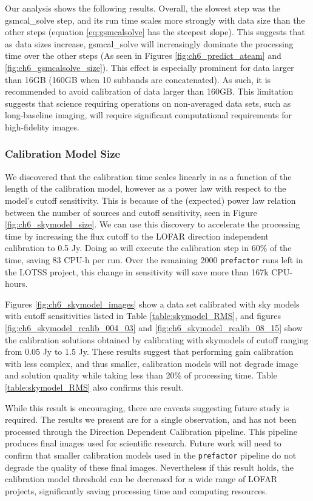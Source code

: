 Our analysis shows the following results. Overall, the slowest step was the {\selectfont gsmcal\_solve} step, and its run time scales more strongly with data size than the other steps (equation \ref{eq:gsmcalsolve} has the steepest slope). This suggests that as data sizes increase, {\selectfont gsmcal\_solve} will increasingly dominate the processing time over the other steps (As seen in Figures \ref{fig:ch6_predict_ateam} and \ref{fig:ch6_gsmcalsolve_size}). This effect is especially prominent for data larger than 16GB (160GB when 10 subbands are concatenated). As such, it is recommended to avoid calibration of data larger than 160GB. This limitation suggests that science requiring operations on non-averaged data sets, such as long-baseline imaging, will require significant computational requirements for high-fidelity images.

\subsubsection{Calibration Model Size}
We discovered that the calibration time scales linearly in as a function of the length of the calibration model, however as a power law with respect to the model's cutoff sensitivity. This is because of the (expected) power law relation between the number of sources and cutoff sensitivity, seen in Figure \ref{fig:ch6_skymodel_size}. We can use this discovery to accelerate the processing time by increasing the flux cutoff to the LOFAR direction independent calibration to 0.5 Jy. Doing so will execute the calibration step in 60\% of the time, saving 83 CPU-h per run. Over the remaining 2000 \texttt{prefactor} runs left in the LOTSS project, this change in sensitivity will save more than 167k CPU-hours. 

Figures \ref{fig:ch6_skymodel_images} show a data set calibrated with sky models with cutoff sensitivities listed in Table \ref{table:skymodel_RMS}, and figures  \ref{fig:ch6_skymodel_rcalib_004_03} and \ref{fig:ch6_skymodel_rcalib_08_15} show the calibration solutions obtained by calibrating with skymodels of cutoff ranging from 0.05 Jy to 1.5 Jy. These results suggest that performing gain calibration with less complex, and thus smaller, calibration models will not degrade image and solution quality while taking less than 20\% of processing time. Table \ref{table:skymodel_RMS} also confirms this result. 

While this result is encouraging, there are caveats suggesting future study is required. The results we present are for a single observation, and has not been processed through the Direction Dependent Calibration pipeline. This pipeline produces final images used for scientific research. Future work will need to confirm that smaller calibration models used in the \texttt{prefactor} pipeline do not degrade the quality of these final images. Nevertheless if this result holds, the calibration model threshold can be decreased for a wide range of LOFAR projects, significantly saving processing time and computing resources. 

